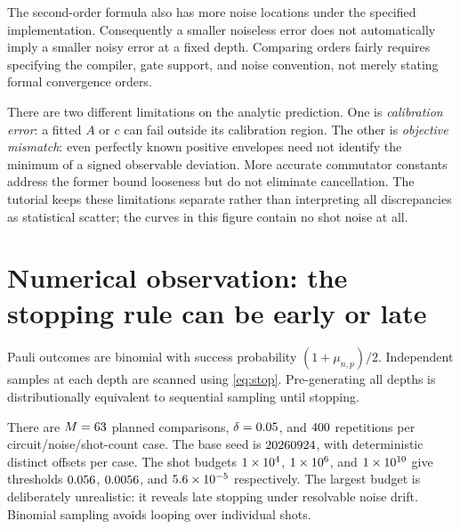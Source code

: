 \documentclass{article}
\begin{document}
The second-order formula also has more noise locations under the specified implementation. Consequently a smaller noiseless error does not automatically imply a smaller noisy error at a fixed depth. Comparing orders fairly requires specifying the compiler, gate support, and noise convention, not merely stating formal convergence orders.

There are two different limitations on the analytic prediction. One is \emph{calibration error}: a fitted $A$ or $c$ can fail outside its calibration region. The other is \emph{objective mismatch}: even perfectly known positive envelopes need not identify the minimum of a signed observable deviation. More accurate commutator constants address the former bound looseness but do not eliminate cancellation. The tutorial keeps these limitations separate rather than interpreting all discrepancies as statistical scatter; the curves in this figure contain no shot noise at all.

\section{Numerical observation: the stopping rule can be early or late}
Pauli outcomes are binomial with success probability $(1+\mu_{n,p})/2$. Independent samples at each depth are scanned using \eqref{eq:stop}. Pre-generating all depths is distributionally equivalent to sequential sampling until stopping.

There are $M=63$ planned comparisons, $\delta=0.05$, and $400$ repetitions per circuit/noise/shot-count case. The base seed is $20260924$, with deterministic distinct offsets per case. The shot budgets $1\times 10^{4}$, $1\times 10^{6}$, and $1\times 10^{10}$ give thresholds $0.056$, $0.0056$, and $5.6\times 10^{-5}$ respectively. The largest budget is deliberately unrealistic: it reveals late stopping under resolvable noise drift. Binomial sampling avoids looping over individual shots.

\begin{table}[ht]
\centering\small

\caption{Generated Monte Carlo stopping results. Early and late compare the returned depth with $n_{\rm emp}$ in Table~\ref{tab:opt}. Their percentages exclude exact matches. The error ratio evaluates the exact error at the median stopping depth, divided by $e_{\min}=e(n_{\rm emp})$; it is not the median of per-run error ratios. ``Cap'' means no earlier pair triggered; it is a subset of late outcomes in this experiment, not an additional disjoint category.}
\label{tab:stop}
\end{table}
\end{document}
